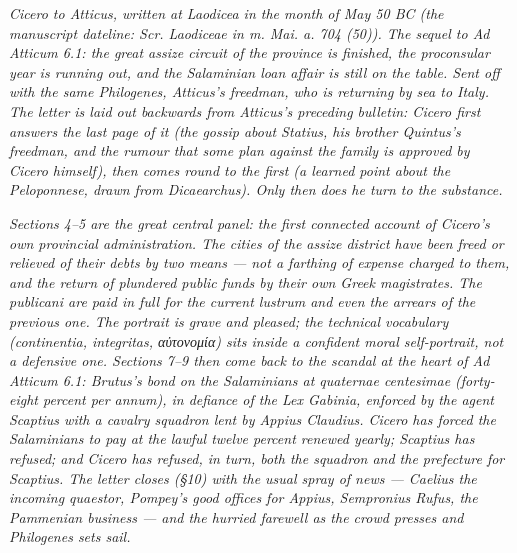 
\textit{Cicero to Atticus, written at Laodicea in the
month of May 50 BC (the manuscript dateline:
\textit{Scr. Laodiceae in m. Mai. a. 704 (50)}). The
sequel to \textit{Ad Atticum} 6.1: the great assize
circuit of the province is finished, the proconsular
year is running out, and the Salaminian loan affair is
still on the table. Sent off with the same Philogenes,
Atticus's freedman, who is returning by sea to Italy.
The letter is laid out backwards from Atticus's
preceding bulletin: Cicero first answers the last
page of it (the gossip about Statius, his brother
Quintus's freedman, and the rumour that some plan
against the family is approved by Cicero himself),
then comes round to the first (a learned point about
the Peloponnese, drawn from Dicaearchus). Only then
does he turn to the substance.}

\textit{Sections 4--5 are the great central panel: the
first connected account of Cicero's own provincial
administration. The cities of the assize district have
been freed or relieved of their debts by two means ---
not a farthing of expense charged to them, and the
return of plundered public funds by their own Greek
magistrates. The publicani are paid in full for the
current lustrum and even the arrears of the previous
one. The portrait is grave and pleased; the technical
vocabulary (\textit{continentia}, \textit{integritas},
\textit{αὐτονομία}) sits inside a confident
moral self-portrait, not a defensive one. Sections
7--9 then come back to the scandal at the heart of
\textit{Ad Atticum} 6.1: Brutus's bond on the
Salaminians at \textit{quaternae centesimae}
(forty-eight percent per annum), in defiance of the
Lex Gabinia, enforced by the agent Scaptius with a
cavalry squadron lent by Appius Claudius. Cicero has
forced the Salaminians to pay at the lawful twelve
percent renewed yearly; Scaptius has refused; and
Cicero has refused, in turn, both the squadron and the
prefecture for Scaptius. The letter closes (\S 10)
with the usual spray of news --- Caelius the
incoming quaestor, Pompey's good offices for Appius,
Sempronius Rufus, the Pammenian business --- and the
hurried farewell as the crowd presses and Philogenes
sets sail.}
